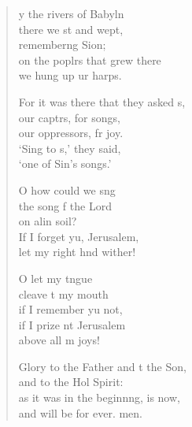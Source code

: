 \settowidth{\versewidth}{For it was there that they asked us, +}
\begin{verse}%
  \begin{patverse}
y the rivers of Babyln\Flex\\
    there we st and wept,\Med\\
    remember\pointup{\i}ng Sion;\\
on the poplrs that grew there\Med\\
    we hung up ur harps.

For it was there that they asked s,\Flex\\
    our captrs, for songs,\Med\\
    our oppressors, fr joy.\\
‘Sing to s,’ they said,\Med\\
    ‘one of Sin’s songs.’

O how could we s\pointup{\i}ng\Flex\\
    the song f the Lord\Med\\
    on alin soil?\\
If I forget yu, Jerusalem,\Med\\
    let my right hnd wither!

O let my tngue\Flex\\
    cleave t my mouth\Med\\
    if I remember yu not,\\
if I prize nt Jerusalem\Med\\
    above all m joys!

Glory to the Father and t the Son,\Med\\
    and to the Hol Spirit:\\
as it was in the beginn\pointup{\i}ng, is now,\Med\\
    and will be for ever. men.
  \end{patverse}
\end{verse}
